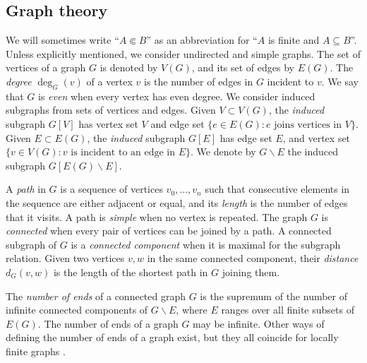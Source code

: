 \documentclass[10pt,A4]{amsart}
\theoremstyle{definition}
\theoremstyle{definition}
\newcommand{\vir}[1]{``#1''}
\begin{document}
\subsection*{Graph theory}
We will sometimes write \vir{$A \Subset B$} as an abbreviation for \vir{$A$ is finite and $A \subseteq B$}. Unless explicitly mentioned, we consider undirected and simple graphs. The set of vertices of a graph $G$ is denoted by $V(G)$, and its set of edges by $E(G)$. The \emph{degree} $\deg_G(v)$ of a vertex $v$ is the number of edges in $G$ incident to $v$. We say that $G$ is \emph{even} when every vertex has even degree. %
We consider induced subgraphs from sets of vertices and edges. Given $V\subset V(G)$, the \emph{induced} subgraph $G[V]$ has vertex set $V$ and edge set  $\{e\in E(G) : \text{$e$ joins vertices in $V$}\}$. Given $E\subset E(G)$, the \emph{induced} subgraph $G[E]$ has edge set $E$, and vertex set $\{v\in V(G) : \text{$v$ is incident to an edge in $E$}\}$. We denote by $G\smallsetminus E$ the induced subgraph $G[E(G)\smallsetminus E]$. 

A \emph{path} in $G$ is a sequence of vertices $v_0,\dots,v_n$ such that consecutive elements in the sequence are either adjacent or equal, and its \emph{length} is the number of edges that it visits. A path is \textit{simple} when no vertex is repeated. The graph $G$ is \emph{connected} when every pair of vertices can be joined by a path. A connected subgraph of $G$ is a \emph{connected component} when it is maximal for the subgraph relation. Given two vertices $v,w$ in the same connected component, their \emph{distance} $d_G(v,w)$ is the length of the shortest path in $G$ joining them.  


The \emph{number of ends} of a connected graph $G$ is the supremum of the number of infinite connected components of $G\smallsetminus E$, where $E$ ranges over all finite subsets of $E(G)$. The number of ends of a graph $G$ may be infinite. Other ways of defining the number of ends of a graph exist, but they all coincide for locally finite graphs \cite{diestel_graphtheoretical_2003}. 
\end{document}
